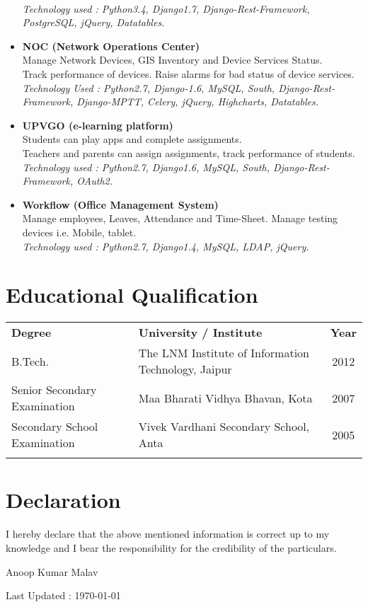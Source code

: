 \documentclass[11pt]{article}
\begin{document}
\begin{itemize}
    \\ \textit{Technology used : Python3.4, Django1.7, Django-Rest-Framework, PostgreSQL, jQuery, Datatables.}
 \item \textbf{NOC (Network Operations Center)}
    \\ Manage Network Devices, GIS Inventory and Device Services Status.
    \\ Track performance of devices. Raise alarms for bad status of device services.
    \\ \textit{Technology Used : Python2.7, Django-1.6, MySQL, South, Django-Rest-Framework, Django-MPTT, Celery, jQuery, Highcharts, Datatables.}
 \item \textbf{UPVGO (e-learning platform)}
    \\ Students can play apps and complete assignments.
    \\ Teachers and parents can assign assignments, track performance of students.
    \\ \textit{Technology used : Python2.7, Django1.6, MySQL, South, Django-Rest-Framework, OAuth2.}
 \item \textbf{Workflow (Office Management System)}
    \\ Manage employees, Leaves, Attendance and Time-Sheet. Manage testing devices i.e. Mobile, tablet.
    \\ \textit{Technology used : Python2.7, Django1.4, MySQL, LDAP, jQuery.}
\end{itemize}

\section*{Educational Qualification}
\begin{tabular}{l l c }
\textbf{Degree} & \textbf{University / Institute} & \textbf{Year}\\[0.2cm]
B.Tech. & The LNM Institute of Information Technology, Jaipur & 2012\\[0.2cm]
Senior Secondary Examination & Maa Bharati Vidhya Bhavan, Kota & 2007\\[0.2cm]
Secondary School Examination & Vivek Vardhani Secondary School, Anta & 2005\\
 & & & \\
\end{tabular}

\section*{Declaration}
I hereby declare that the above mentioned information is correct up to
my knowledge and I bear the responsibility for the credibility of the particulars.\\
\begin{flushright}
 Anoop Kumar Malav
\end{flushright}

\vfill

\begin{center}

Last Updated : \today

\end{center}
\end{document}
